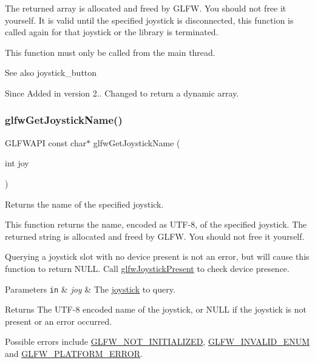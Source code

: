 The returned array is allocated and freed by G\+L\+FW. You should not free it yourself. It is valid until the specified joystick is disconnected, this function is called again for that joystick or the library is terminated.

This function must only be called from the main thread.

\begin{DoxySeeAlso}{See also}
joystick\+\_\+button
\end{DoxySeeAlso}
\begin{DoxySince}{Since}
Added in version 2..  Changed to return a dynamic array. 
\end{DoxySince}
\mbox{\label{group__input_gac50a4fd9b01886cf9fa2c45f19191fb8}} 
\subsubsection{\texorpdfstring{glfw\+Get\+Joystick\+Name()}{glfwGetJoystickName()}}
{\footnotesize\ttfamily G\+L\+F\+W\+A\+PI const char$\ast$ glfw\+Get\+Joystick\+Name (\begin{DoxyParamCaption}\item[{int}]{joy }\end{DoxyParamCaption})}



Returns the name of the specified joystick. 

This function returns the name, encoded as U\+T\+F-\/8, of the specified joystick. The returned string is allocated and freed by G\+L\+FW. You should not free it yourself.

Querying a joystick slot with no device present is not an error, but will cause this function to return {\ttfamily N\+U\+LL}. Call \hyperlink{group__input_ga7f81f22f355f4b7d315caf73cdfd9906}{glfw\+Joystick\+Present} to check device presence.


\begin{DoxyParams}[1]{Parameters}
\mbox{\tt in}  & {\em joy} & The \hyperlink{group__joysticks}{joystick} to query. \\
\hline
\end{DoxyParams}
\begin{DoxyReturn}{Returns}
The U\+T\+F-\/8 encoded name of the joystick, or {\ttfamily N\+U\+LL} if the joystick is not present or an error occurred.
\end{DoxyReturn}
Possible errors include \hyperlink{group__errors_ga2374ee02c177f12e1fa76ff3ed15e14a}{G\+L\+F\+W\+\_\+\+N\+O\+T\+\_\+\+I\+N\+I\+T\+I\+A\+L\+I\+Z\+ED}, \hyperlink{group__errors_ga76f6bb9c4eea73db675f096b404593ce}{G\+L\+F\+W\+\_\+\+I\+N\+V\+A\+L\+I\+D\+\_\+\+E\+N\+UM} and \hyperlink{group__errors_gad44162d78100ea5e87cdd38426b8c7a1}{G\+L\+F\+W\+\_\+\+P\+L\+A\+T\+F\+O\+R\+M\+\_\+\+E\+R\+R\+OR}.

